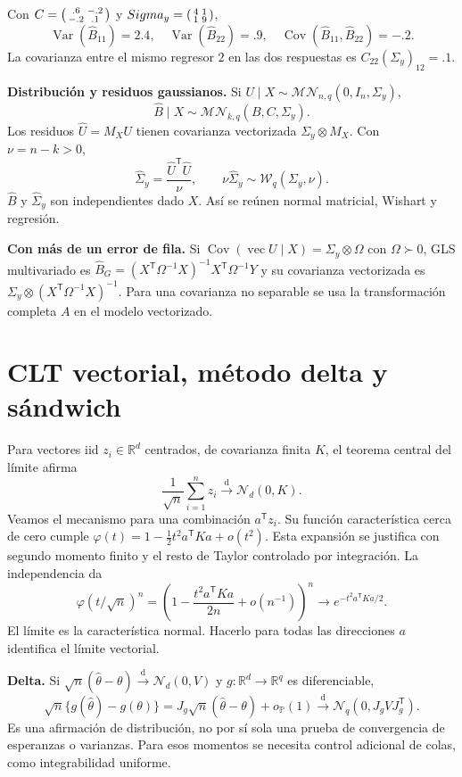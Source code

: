\documentclass[11pt,a4paper]{article}
\newcommand{\R}{\mathbb R}
\newcommand{\Prob}{\mathbb P}
\newcommand{\T}{^{\mathsf T}}
\DeclareMathOperator{\Var}{Var}
\DeclareMathOperator{\Cov}{Cov}
\DeclareMathOperator{\vecop}{vec}
\newcommand{\dto}{\xrightarrow{\mathrm d}}
\newcommand{\Normal}{\mathcal N}
\newcommand{\topic}[2]{\clearpage\section{#1}\label{#2}}
\theoremstyle{definition}\newtheorem{definicion}[teorema]{Definición}
\begin{document}
\begin{ejemplo}
Con $C=\begin{psmallmatrix}.6&-.2\\-.2&.1\end{psmallmatrix}$ y
$\Sigma_y=\begin{psmallmatrix}4&1\\1&9\end{psmallmatrix}$,
\[
\Var(\widehat B_{11})=2.4,\quad
\Var(\widehat B_{22})=.9,\quad
\Cov(\widehat B_{11},\widehat B_{22})=-.2.
\]
La covarianza entre el mismo regresor $2$ en las dos respuestas es
$C_{22}(\Sigma_y)_{12}=.1$.
\end{ejemplo}
\textbf{Distribución y residuos gaussianos.}
Si $U\mid X\sim\mathcal{MN}_{n,q}(0,I_n,\Sigma_y)$,
\[
\widehat B\mid X\sim\mathcal{MN}_{k,q}(B,C,\Sigma_y).
\]
Los residuos $\widehat U=M_XU$ tienen covarianza vectorizada
$\Sigma_y\otimes M_X$.
Con $\nu=n-k>0$,
\[
\widehat\Sigma_y=\frac{\widehat U\T\widehat U}{\nu},\qquad
\nu\widehat\Sigma_y\sim\mathcal W_q(\Sigma_y,\nu).
\]
$\widehat B$ y $\widehat\Sigma_y$ son independientes dado $X$.
Así se reúnen normal matricial, Wishart y regresión.

\textbf{Con más de un error de fila.}
Si $\Cov(\vecop U\mid X)=\Sigma_y\otimes\Omega$ con $\Omega\succ0$,
GLS multivariado es
$\widehat B_G=(X\T\Omega^{-1}X)^{-1}X\T\Omega^{-1}Y$ y
su covarianza vectorizada es
$\Sigma_y\otimes(X\T\Omega^{-1}X)^{-1}$.
Para una covarianza no separable se usa la transformación completa
$A$ en el modelo vectorizado.

\topic{CLT vectorial, método delta y sándwich}{s42}
Para vectores iid $z_i\in\R^d$ centrados, de covarianza finita $K$,
el teorema central del límite afirma
\[
\frac1{\sqrt n}\sum_{i=1}^nz_i\dto\Normal_d(0,K).
\]
Veamos el mecanismo para una combinación $a\T z_i$.
Su función característica cerca de cero cumple
$\varphi(t)=1-\tfrac12t^2a\T Ka+o(t^2)$.
Esta expansión se justifica con segundo momento finito y el resto
de Taylor controlado por integración.
La independencia da
\[
\varphi(t/\sqrt n)^n
=\left(1-\frac{t^2a\T Ka}{2n}+o(n^{-1})\right)^n
\longrightarrow e^{-t^2a\T Ka/2}.
\]
El límite es la característica normal. Hacerlo para todas las direcciones
$a$ identifica el límite vectorial.

\textbf{Delta.} Si
$\sqrt n(\widehat\theta-\theta)\dto\Normal_d(0,V)$
y $g:\R^d\to\R^q$ es diferenciable,
\[
\sqrt n\{g(\widehat\theta)-g(\theta)\}
=J_g\sqrt n(\widehat\theta-\theta)+o_{\Prob}(1)
\dto\Normal_q(0,J_gVJ_g\T).
\]
Es una afirmación de distribución, no por sí sola una prueba de convergencia
de esperanzas o varianzas. Para esos momentos se necesita control adicional
de colas, como integrabilidad uniforme.
\end{document}
